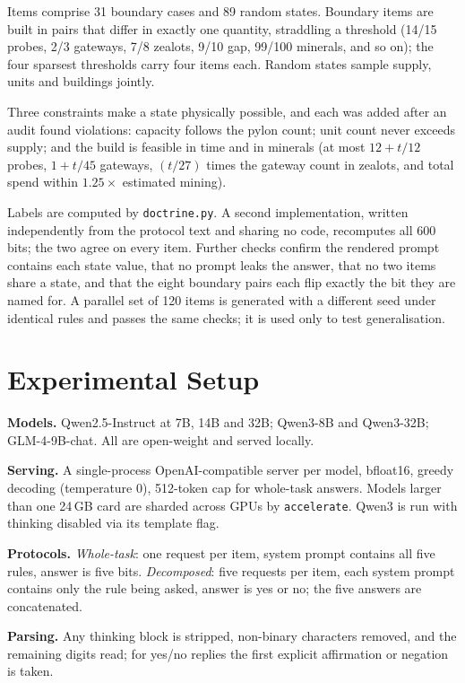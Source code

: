 \documentclass[journal]{IEEEtran}
\begin{document}
Items comprise 31 boundary cases and 89 random states. Boundary items are built in pairs that
differ in exactly one quantity, straddling a threshold (14/15 probes, 2/3 gateways, 7/8
zealots, 9/10 gap, 99/100 minerals, and so on); the four sparsest thresholds carry four items
each. Random states sample supply, units and buildings jointly.

Three constraints make a state physically possible, and each was added after an audit found
violations: capacity follows the pylon count; unit count never exceeds supply; and the build is
feasible in time and in minerals (at most $12 + t/12$ probes, $1 + t/45$ gateways, $(t/27)$
times the gateway count in zealots, and total spend within $1.25\times$ estimated mining).

Labels are computed by \texttt{doctrine.py}. A second implementation, written independently
from the protocol text and sharing no code, recomputes all 600 bits; the two agree on every
item. Further checks confirm the rendered prompt contains each state value, that no prompt
leaks the answer, that no two items share a state, and that the eight boundary pairs each flip
exactly the bit they are named for. A parallel set of 120 items is generated with a different
seed under identical rules and passes the same checks; it is used only to test generalisation.

\section{Experimental Setup}

\textbf{Models.} Qwen2.5-Instruct at 7B, 14B and 32B; Qwen3-8B and Qwen3-32B; GLM-4-9B-chat.
All are open-weight and served locally.

\textbf{Serving.} A single-process OpenAI-compatible server per model, bfloat16, greedy
decoding (temperature 0), 512-token cap for whole-task answers. Models larger than one 24\,GB
card are sharded across GPUs by \texttt{accelerate}. Qwen3 is run with thinking disabled via
its template flag.

\textbf{Protocols.} \emph{Whole-task}: one request per item, system prompt contains all five
rules, answer is five bits. \emph{Decomposed}: five requests per item, each system prompt
contains only the rule being asked, answer is yes or no; the five answers are concatenated.

\textbf{Parsing.} Any thinking block is stripped, non-binary characters removed, and the
remaining digits read; for yes/no replies the first explicit affirmation or negation is taken.
\end{document}
